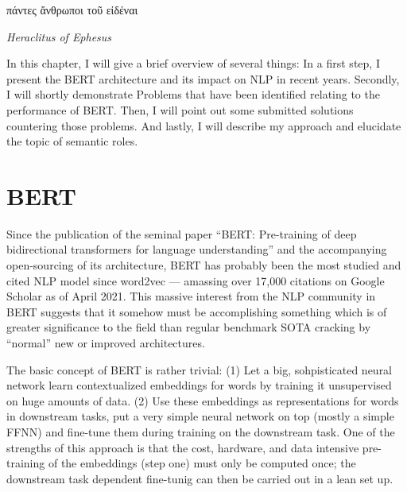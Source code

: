 \label{chap:2_approach}

\epigraph{\textgreek{πάντες ἄνθρωποι τοῦ εἰδέναι}}{\textit{Heraclitus of Ephesus}}


In this chapter, I will give a brief overview of several things: In a first step, I present
the BERT architecture and its impact on NLP in recent years. Secondly, I will shortly demonstrate
Problems that have been identified relating to the performance of BERT. Then, I will point out
some submitted solutions countering those problems. And lastly, I will describe my approach and
elucidate the topic of semantic roles.

\section{BERT}

Since the publication of the seminal paper ``BERT: Pre-training of deep bidirectional transformers
for language understanding'' \cite{devlin2018bert} and the accompanying open-sourcing of its
architecture, BERT has probably been the
most studied and cited NLP model since word2vec \cite{mikolov2013distributed} --- amassing over
17,000 citations on Google Scholar as of April 2021. This massive interest from the NLP community
in BERT suggests that it somehow must be accomplishing something which is of greater significance
to the field than regular benchmark SOTA cracking by ``normal'' new or improved architectures.


The basic concept of BERT is rather trivial: (1) Let a big, sohpisticated neural network learn
contextualized embeddings for words by training it unsupervised on huge amounts of data. (2)
Use these embeddings as representations for words in downstream tasks, put a very simple neural
network on top (mostly a simple FFNN) and fine-tune them during training on the downstream task.
One of the strengths of this approach is that the cost, hardware, and data intensive pre-training of the
embeddings (step one) must only be computed once; the downstream task dependent fine-tunig can then
be carried out in a lean set up.

